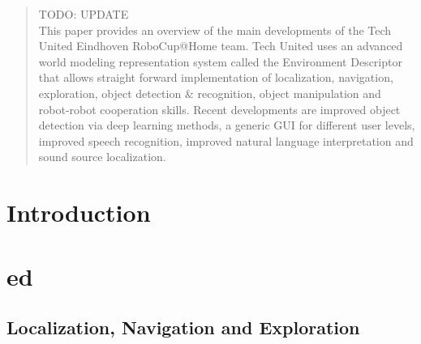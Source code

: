 \documentclass[runningheads,a4paper]{llncs}
\begin{document}
\begin{abstract}





TODO: UPDATE \\
This paper provides an overview of the main developments of the Tech United Eindhoven RoboCup@Home team. Tech United uses an advanced world modeling representation system called the Environment Descriptor that allows straight forward implementation of localization, navigation, exploration, object detection \& recognition, object manipulation and robot-robot cooperation skills. Recent developments are improved object detection via deep learning methods, a generic GUI for different user levels, improved speech recognition, improved natural language interpretation and sound source localization.

\end{abstract}



\section{Introduction}


\section{\acrfull{ed}}


\subsection{Localization, Navigation and Exploration}

\end{document}
